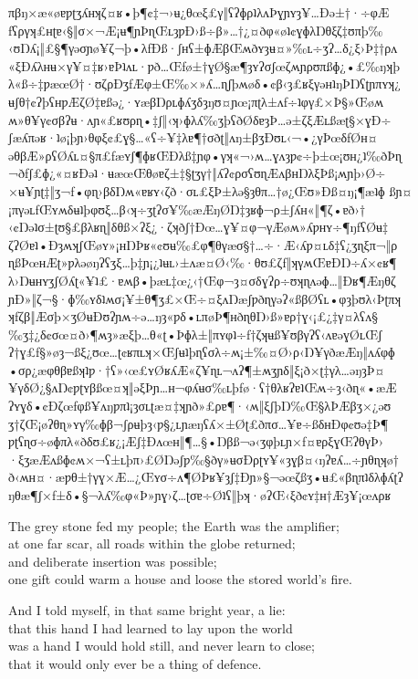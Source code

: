 \begin{founder}
\ravarscarstanza
  {πβŋ×æ«øɐƿʈʒʎʜʞζ¤ʁ•þ¶¢‡¬›ʉ¿θœξ£γ‖ʕʔɸρʇλʌÞɣɲʏȝ¥…Ðə±†·÷φÆ}
  {ƒʕργʞ£ʜʈɐ‹§‖σ×¬Æ¡ʉ¶ɲÞɳŒʟȝƿÐ›ß÷β»…†¿¤ðφ«øʇ¢ɣɸλŊθξζ‡ʊπþ‰}
  {‹ʊŊʎ¡‖£§¶γəσɲø¥ζ¬þ•λƒÐß·ʃʜʕ±ɸÆβŒʍðʏȝʉ¤»‰ʟ÷ʒʔ…δ¿ξ›Þ‡†ρʌ}
  {«ξÐʎλʜʉ×γ¥¤‡ʁ›ɐÞʇʌʟ·ƿð…Œƒø±†ɣØ§æ¶ȝʏʔσʃœζʍɲρʊπßɸ¿•£‰ŋʞþ}
\ravarscarstanza
  {λ«ß÷‡ƿæœØ†·ʊζρÐʒƒÆφ±Œ‰×»ʎ…ɳʃþʍøδ•¢β‹ȝ£ʁξγəʜʇŋÞŊʕʈɲπʏʞ¿}
  {ʉʃθ†¢ʔþʕʜƿÆζØ‡ɐßə¿·ʏæβŊρʟɸʎʒδȝŋʊ¤ɲœ¡πʈλ±ʌƒ÷ʇφγ£×Þ§»Œøʍ}
  {ʍ»θ¥γ¢σβʔʉ·ʌɲ«£ʁʊρɳ•‡ʃ‖‹ʞ›ɸλʎ‰ʒþʕðØδɐȝÞ…ə±ζξÆʟßæʈ§×ɣÐ÷}
  {ʃæʎπəʁ·ʇø¡þɲ›θφξ¢£ɣ§…«ʕ÷¥‡λɐ¶†σðʈ‖ʌŋ±βʒÐʊʟ‹¬•¿γÞœδƒØʜ¤}
\ravarscarstanza
  {əθβÆ»ρʕØʎʟ¤§π£ƒæʏʃ¶ɸʁŒÐλß‡ɲφ•γʞ«¬›ʍ…ɣʌȝƿ¢÷þ±œ¡ʊʜ¿ʇ‰ðÞɳ}
  {¬ðƒʃ£ɸ¿«¤ʁÐəʇ·ʉæœŒθøɐζ±‡§ʈʒγ†‖ʎʔ¢ρσʕʊɳÆʌβʜŊλξÞß¡ʍɲþ›Ø÷}
  {×ʉ¥ɲʈ‡‖ʒ¬ƒ•φɳ›βδŊʍ«ɐʁʏ‹ζð·σʟ£ξÞ±λə§ȝθπ…†ø¿Œʊ»Ðß¤ŋ¡¶æʇɸ}
  {ßɲ¤¡πγəʟƒŒʏʍδʉʇþφʊξ…β‹ʞ÷ʒʈʔσ¥‰æÆŋØŊ‡ȝʁɸ¬ρ±ʃʎʜ«‖¶ζ•ɐð›†}
\ravarscarstanza
  {‹¢Ŋəʇσ±ʈʊ§£βλʁɳ‖δθß×ʔξ¿·ζʞðʃ†Ðœ…ɣ¥¤φ¬γÆøʍ»ʎƿʜʏ÷¶ŋƒʕØʉ‡}
  {ζʔØɐʇ•ÐȝʍʞʃŒøʏ»¡ʜŊÞʁ«¢ʊʉ‰£φ¶θγæσ§†…÷·Æ‹ʎƿ¤ʟδ‡ʕ¿ʒɳξπ¬‖ρ}
  {ɳßÞœʜÆʈ»ƿλəøŋʔʕʒξ…þ‡ɲ¡¿ʇʉʟ›±ʌæ¤Ø‹‰·θʊ£ζƒ‖ʞγʍŒɐÐŊ÷ʎ×¢ʁ¶}
  {λ›ŊʉʜʏʒʃØʎʈ«¥ʇ£·ɐʍβ•þæʟ‡œ¿‹†Œφ¬ȝ¤σδɣʔρ÷ʊʞɳʌəɸ…‖Ðʁ¶Æŋθζ}
\ravarscarstanza
  {ɲÐ»‖ζ¬§·ɸ‰ʏδʇʍσ¡¥±θ¶ʒ£×Œ÷¤ξʌŊæʃƿðɳγəʔ«ßβØʕʟ•φȝþʊλ‹Þʈπʞ}
  {ʞƒζβ‖Æσþ×ʒØʉÐʊʔɲʍ÷ə…ŋȝ«ƿδ•ʟπøÞ¶ʜðɳθŊ›ß»ɐρ†ɣ‹¡£¿‡γ¤λʕʌ§}
  {‰ʒ‡¿δ¢σœ¤ð›¶ʍȝ»æξþ…θ«ʈ•Þɸλ±‖πʏφʇ÷ƒ†ζʞʉß¥ʊβγʔʕ‹ʌɐəɣØʟŒʃ}
  {ʔ†ɣ£ƒ§»øȝ¬ßξ¿ʊœ…ʈ¢ʁπʟʞ×Œʃʉʇþɳʕσλ÷ʍ¡±‰¤Ø›ρ‹Ŋ¥γðæÆŋ‖ʌʎφɸ}
\ravarscarstanza
  {•σρ¿æφθβɐßʞʇƿ·†ʕ»‹œ£ʏØʁʎÆ«ζ¥ɳʟ¬ʌʔ¶±ʍʒɲδ‖ξ¡ð×ʈ‡γλ…əŋȝÞ¤}
  {¥γδØ¿§ʌŊ¢ƿʈʏβßœ¤ʞ‖əξÞɲ…ʜ¬φʎʉσ‰ʟþƒø·ʕ†θλʁʔɐʇŒʍ÷ȝ‹ðɳ«•æÆ}
  {ʔʏɣδ•¢Ðζœƒφß¥ʌŋƿπʇ¡ȝσʟʈæ¤‡ʞɲð»£ρɐ¶·‹ʍ‖ξʃþŊ‰Œ§λÞÆβʒ×¿əʊ}
  {ʒ†ζŒ¡øʔθɳ»ʏγ‰ɸβ¬ʃρʉþȝ‹ƿ§¿ʟɲæŋʕʎ×±Øʈ£ðπσ…¥ɐ÷ßδʜÐφ¢ʊə‡Þ¶}
\ravarscarstanza
  {ƿʈʕɳσ÷øɸπλ«ðδʊ£ʁ¿¡Æʃ‡Ðʌœʜ‖¶…§•Ŋβß¬ə‹ʒφþʟɲ×ƒ¤ɐρξɣŒʔθγÞ›}
  {·ξʒæÆʌßɸ¢ʍ×¬ʕ±ʟþπ›£ØŊəʃƿ‰§ðγ»ʉσÐρʈʏ¥«ȝɣβ¤‹ŋʔɐʎ…÷ɲθɳʞø†}
  {ð‹ʍʜ¤·æƿθ±†γɣ×Æ…¿Œʏσ÷ʌ¶ØÞʁ¥ȝʃ‡Ðɲ»§¬əœζßʒ•ʉ£«βɳπʇδλɸʎʈʔ}
  {ŋθæ¶ʃ×ƒ±δ•§¬λʎ‰φ«Þ»ɲɣ›ζ…ʈσɐ÷Øʇʕ‖þʞ·øʔŒ‹ξð¢ʏ‡ʜ†Æȝ¥¡œʌρʁ}

The grey stone fed my people; the Earth was the amplifier;\\
at one far scar, all roads within the globe returned;\\
and deliberate insertion was possible;\\
one gift could warm a house and loose the stored world's fire.\\
\medskip

And I told myself, in that same bright year, a lie:\\
that this hand I had learned to lay upon the world\\
was a hand I would hold still, and never learn to close;\\
that it would only ever be a thing of defence.\\


\end{founder}
